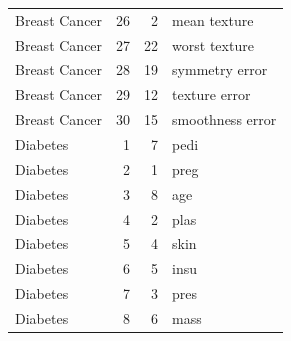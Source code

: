 \begin{longtable}{lrrp{}}
Breast Cancer & 26 & 2 & mean texture \\
Breast Cancer & 27 & 22 & worst texture \\
Breast Cancer & 28 & 19 & symmetry error \\
Breast Cancer & 29 & 12 & texture error \\
Breast Cancer & 30 & 15 & smoothness error \\
Diabetes & 1 & 7 & pedi \\
Diabetes & 2 & 1 & preg \\
Diabetes & 3 & 8 & age \\
Diabetes & 4 & 2 & plas \\
Diabetes & 5 & 4 & skin \\
Diabetes & 6 & 5 & insu \\
Diabetes & 7 & 3 & pres \\
Diabetes & 8 & 6 & mass \\
\end{longtable}
